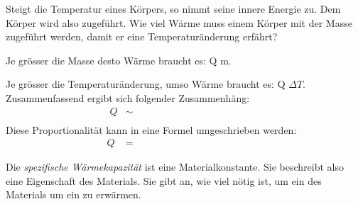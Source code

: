 \begin{aufgabe}
\StartLueckentext

Steigt die Temperatur eines Körpers, so nimmt seine innere Energie zu. Dem Körper wird also  zugeführt.
Wie viel Wärme  muss einem Körper mit der Masse  zugeführt werden, damit er eine Temperaturänderung \gl{$\Delta \vartheta$} erfährt?

Je grösser die Masse desto  Wärme braucht es: Q \gl{$\sim$} m.

Je grösser die Temperaturänderung, umso  Wärme braucht es: Q \gl{$\sim$} $\Delta T$.
Zusammenfassend ergibt sich folgender Zusammenhäng:
\begin{eqnarray*}
	Q &\sim\phantom{c\cdot m\cdot \Delta T \text{man kann hier noch}}\\ 
\end{eqnarray*}
Diese Proportionalität kann in eine Formel umgeschrieben werden:
\begin{eqnarray*}
	Q &=\phantom{c\cdot m\cdot \Delta T \text{man kann hier noch}} 
\end{eqnarray*}

Die \emph{spezifische Wärmekapazität}  ist eine Materialkonstante. Sie beschreibt also eine Eigenschaft des Materials.
Sie gibt an, wie viel  nötig ist, um ein  des Materials um ein  zu erwärmen.

\StoppLueckentext
\end{aufgabe}
